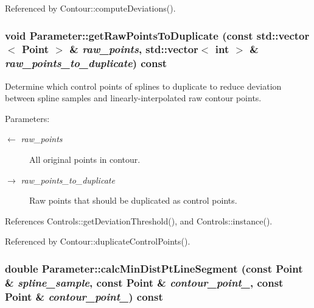 Referenced by Contour::computeDeviations().\hypertarget{classParameter_918287332cac92ccf75c78fb651efc97}{
\subsubsection[getRawPointsToDuplicate]{\setlength{\rightskip}{0pt plus 5cm}void Parameter::getRawPointsToDuplicate (const std::vector$<$ {\bf Point} $>$ \& {\em raw\_\-points}, \/  std::vector$<$ int $>$ \& {\em raw\_\-points\_\-to\_\-duplicate}) const}}
\label{classParameter_918287332cac92ccf75c78fb651efc97}


Determine which control points of splines to duplicate to reduce deviation between spline samples and linearly-interpolated raw contour points. \begin{Desc}
\item[Parameters:]
\begin{description}
\item[\mbox{$\leftarrow$} {\em raw\_\-points}]All original points in contour. \item[\mbox{$\rightarrow$} {\em raw\_\-points\_\-to\_\-duplicate}]Raw points that should be duplicated as control points. \end{description}
\end{Desc}


References Controls::getDeviationThreshold(), and Controls::instance().

Referenced by Contour::duplicateControlPoints().\hypertarget{classParameter_db51977acf04748c2d4a82a619459c0d}{
\subsubsection[calcMinDistPtLineSegment]{\setlength{\rightskip}{0pt plus 5cm}double Parameter::calcMinDistPtLineSegment (const {\bf Point} \& {\em spline\_\-sample}, \/  const {\bf Point} \& {\em contour\_\-point\_}, \/  const {\bf Point} \& {\em contour\_\-point\_}) const}}
\label{classParameter_db51977acf04748c2d4a82a619459c0d}


